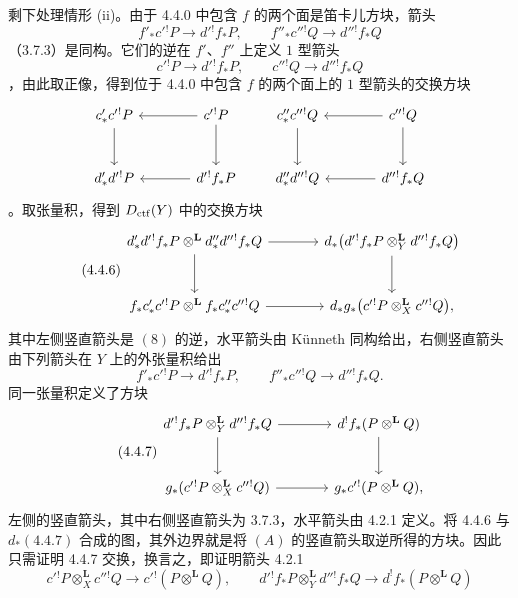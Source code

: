 \begin{prooftext}[证明]
剩下处理情形 (ii)。由于 4.4.0 中包含 $f$ 的两个面是笛卡儿方块，箭头
\[
f'_*c'{}^!P\longrightarrow d'{}^!f_*P,\qquad
f''_*c''{}^!Q\longrightarrow d''{}^!f_*Q
\]
（3.7.3）是同构。它们的逆在 $f'$、$f''$ 上定义 $1$ 型箭头
\[
c'{}^!P\longrightarrow d'{}^!f_*P,\qquad
c''{}^!Q\longrightarrow d''{}^!f_*Q
\]
，由此取正像，得到位于 4.4.0 中包含 $f$ 的两个面上的 $1$ 型箭头的交换方块
\[
\begin{tikzcd}[column sep=large,row sep=large]
c'_*c'{}^!P \arrow[d] & c'{}^!P\arrow[l]\arrow[d]\\
d'_*d'{}^!P & d'{}^!f_*P\arrow[l]
\end{tikzcd}
\qquad
\begin{tikzcd}[column sep=large,row sep=large]
c''_*c''{}^!Q \arrow[d] & c''{}^!Q\arrow[l]\arrow[d]\\
d''_*d''{}^!Q & d''{}^!f_*Q\arrow[l]
\end{tikzcd}
\]
。取张量积，得到 $D_{\mathrm{ctf}}(Y)$ 中的交换方块
\begin{equation}
\tag{4.4.6}
{
\begin{tikzcd}[column sep=large,row sep=large]
d'_*d'{}^!f_*P\otimes^{\mathbf L}d''_*d''{}^!f_*Q
 \arrow[r]\arrow[d] &
d_*\bigl(d'{}^!f_*P\otimes_Y^{\mathbf L}d''{}^!f_*Q\bigr)\arrow[d]\\
f_*c'_*c'{}^!P\otimes^{\mathbf L}f_*c''_*c''{}^!Q
 \arrow[r] &
d_*g_*\bigl(c'{}^!P\otimes_X^{\mathbf L}c''{}^!Q\bigr),
\end{tikzcd}
}
\end{equation}
其中左侧竖直箭头是 $(8)$ 的逆，水平箭头由 Künneth 同构给出，右侧竖直箭头由下列箭头在 $Y$ 上的外张量积给出
\[
f'_*c'{}^!P\longrightarrow d'{}^!f_*P,\qquad
f''_*c''{}^!Q\longrightarrow d''{}^!f_*Q.
\]
同一张量积定义了方块
\begin{equation}
\tag{4.4.7}
\begin{tikzcd}[column sep=large,row sep=large]
d'{}^!f_*P\otimes_Y^{\mathbf L}d''{}^!f_*Q
 \arrow[r]\arrow[d] &
d^!f_*(P\otimes^{\mathbf L}Q)\arrow[d]\\
g_*(c'{}^!P\otimes_X^{\mathbf L}c''{}^!Q)
 \arrow[r] &
g_*c'{}^!(P\otimes^{\mathbf L}Q),
\end{tikzcd}
\end{equation}
左侧的竖直箭头，其中右侧竖直箭头为 3.7.3，水平箭头由 4.2.1 定义。将 4.4.6 与 $d_*(4.4.7)$ 合成的图，其外边界就是将 $(A)$ 的竖直箭头取逆所得的方块。因此只需证明 4.4.7 交换，换言之，即证明箭头 4.2.1
\[
c'{}^!P\otimes_X^{\mathbf L}c''{}^!Q\longrightarrow c'{}^!(P\otimes^{\mathbf L}Q),\qquad
d'{}^!f_*P\otimes_Y^{\mathbf L}d''{}^!f_*Q\longrightarrow d^!f_*(P\otimes^{\mathbf L}Q)
\]
\end{prooftext}

